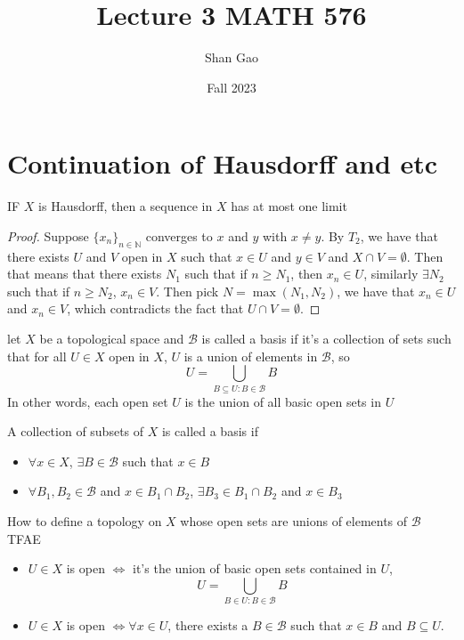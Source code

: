 \documentclass{tufte-handout}
\title{Lecture 3 MATH 576}
\author{Shan Gao}
\date{Fall 2023}  %
\begin{document}
\section{Continuation of Hausdorff and etc}
\begin{proposition}
    IF $X$ is Hausdorff, then a sequence in $X$ has at most one limit
    
\end{proposition}
\begin{proof}
    Suppose $\{x_n\}_{n \in \mathbb{N}}$ converges to $x$ and $y$ with $x \neq y$. By $T_2$, we have that there exists $U$ and $V$ open in $X$ such that $x \in U$ and $y \in V$ and $X \cap V = \emptyset$. Then that means that there exists $N_1$ such that if $n \geq N_1$, then $x_n \in U$, similarly $\exists N_2$ such that if $n \geq N_2$, $x_n \in V$. Then pick $N = \max(N_1, N_2)$, we have that $x_n \in U$ and $x_n \in V$, which contradicts the fact that $U \cap V = \emptyset$. 
\end{proof}
\begin{definition}[basis]
    let $X$ be a topological space and $\mathcal{B}$ is called a basis if it's a collection of sets such that for all $U \in X$ open in $X$, $U$ is a union of elements in $\mathcal{B}$, so 
    \[
        U = \bigcup_{B \subseteq U \colon B \in \mathcal{B}} B
        \]
	In other words, each open set $U$ is the union of all basic open sets in $U$

\end{definition}
\begin{definition}
	A collection of subsets of $X$ is called a basis if 
	\begin{itemize}
		\item $\forall x \in X$, $\exists B \in \mathcal{B}$ such that $x \in B$
		\item $\forall B_1, B_2 \in \mathcal{B}$ and $x \in B_1 \cap B_2$, $\exists B_3 \in B_1 \cap B_2$ and $x \in B_3$
	\end{itemize}
\end{definition}
\begin{lemma}
	How to define a topology on $X$ whose open sets are unions of elements of $\mathcal{B}$ TFAE
	\begin{itemize}
		\item $U \in X$ is open $\iff$ it's the union of basic open sets contained in $U$, $$ U = \bigcup_{B \in U\colon B \in \mathcal{B}} B$$
		\item $U \in X$ is open $\iff \forall x \in U$, there exists a $B \in \mathcal{B}$ such that $x \in B$ and $B \subseteq U$. 
	\end{itemize}
\end{lemma}
\end{document}
